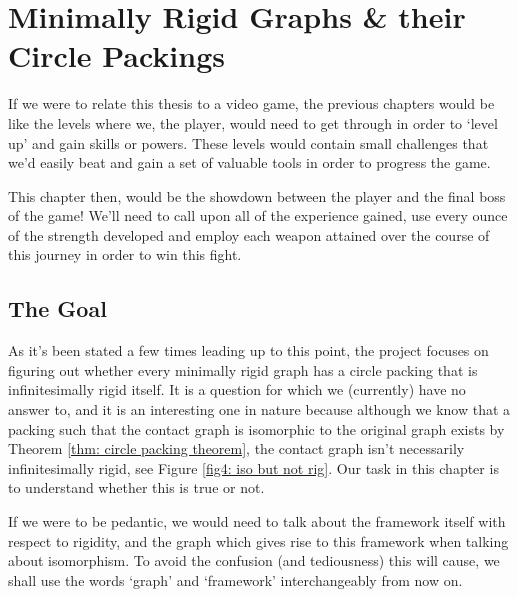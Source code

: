 \chapter{Minimally Rigid Graphs \& their Circle Packings} %
\label{ch: 4}

\begin{flushleft}
If we were to relate this thesis to a video game, the previous chapters would be like the levels where we, the player, would need to get through in order to `level up' and gain skills or powers. These levels would contain small challenges that we'd easily beat and gain a set of valuable tools in order to progress the game.    
\end{flushleft}

\begin{flushleft}
This chapter then, would be the showdown between the player and the final boss of the game! We'll need to call upon all of the experience gained, use every ounce of the strength developed and employ each weapon attained over the course of this journey in order to win this fight.
\end{flushleft}

\section{The Goal}

\begin{flushleft}
As it's been stated a few times leading up to this point, the project focuses on figuring out whether every minimally rigid graph has a circle packing that is infinitesimally rigid itself. It is a question for which we (currently) have no answer to, and it is an interesting one in nature because although we know that a packing such that the contact graph is isomorphic to the original graph exists by Theorem \ref{thm: circle packing theorem}, the contact graph isn't necessarily infinitesimally rigid, see Figure \ref{fig4: iso but not rig}. Our task in this chapter is to understand whether this is true or not. 
\end{flushleft}

\begin{flushleft} %
If we were to be pedantic, we would need to talk about the framework itself with respect to rigidity, and the graph which gives rise to this framework when talking about isomorphism. To avoid the confusion (and tediousness) this will cause, we shall use the words `graph' and `framework' interchangeably from now on. 
\end{flushleft}

